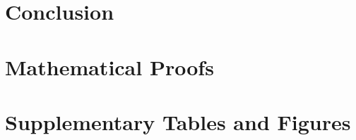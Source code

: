 \documentclass[12pt]{article}
\begin{document}


\section{Conclusion}
\label{sec:conclusion}






\newpage
\appendix
\section{Mathematical Proofs}
\label{app:proofs}

\section{Supplementary Tables and Figures}
\label{app:supplementary}
\end{document}
